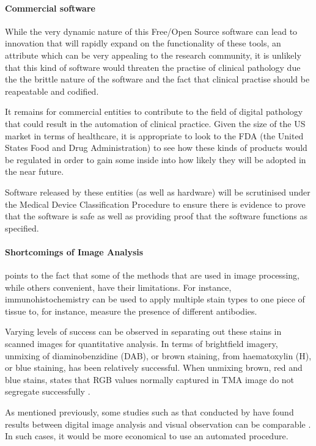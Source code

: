 \documentclass[12pt]{article}
\begin{document}
\paragraph{Commercial software}
While the very dynamic nature of this Free/Open Source software can lead to innovation that will rapidly expand on the 
functionality of these tools, an attribute which can be very appealing to the research community, it is unlikely that
this kind of software would threaten the practise of clinical pathology due the the brittle nature of the software and
the fact that clinical practise should be reapeatable and codified.

It remains for commercial entities to contribute to the field of digital pathology that could result in the automation of
clinical practice. Given the size of the US market in terms of healthcare, it is appropriate to look to the FDA (the
United States Food and Drug Administration) to see how these kinds of products would be regulated in order to gain some
inside into how likely they will be adopted in the near future.

Software released by these entities (as well as hardware) will be scrutinised under the Medical Device Classification
Procedure \parencite{fdadevices} to ensure there is evidence to prove that the software is safe as well as providing
proof that the software functions as specified.

\paragraph{Shortcomings of Image Analysis}
\citeauthor{taylor2006quantification} points to the fact that some of the methods that are used in image processing, 
while others convenient, have their limitations. For instance, immunohistochemistry can be used to apply multiple 
stain types to one piece of tissue to, for instance, measure the presence of different antibodies.

Varying levels of success can be observed in separating out these stains in scanned images for quantitative analysis. 
In terms of brightfield imagery, unmixing of diaminobenzidine (DAB), or brown staining, from haematoxylin (H), or blue 
staining, has been relatively successful. When unmixing brown, red and blue stains, 
\citeauthor{taylor2006quantification} states that RGB values normally captured in TMA image do not segregate 
successfully \parencite{taylor2006quantification}.

As mentioned previously, some studies such as that conducted by \citeauthor{gavrielides2014observer} have found 
results between digital image analysis and visual observation can be comparable \parencite{gavrielides2014observer}. 
In such cases, it would be more economical to use an automated procedure.
\end{document}
